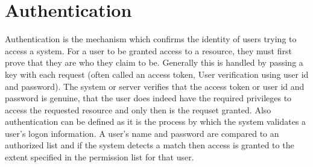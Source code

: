 \section{Authentication}
Authentication is the mechanism which confirms the identity of users trying to access a system. For a user to be granted access to a resource, they must first prove that they are who they claim to be. Generally this is handled by passing a key with each request (often called an access token, User verification using user id and password). The system or server verifies that the access token or user id and password is genuine, that the user does indeed have the required privileges to access the requested resource and only then is the requset granted.
Also authentication can be defined as it is the process by which the system validates a user's logon information. A user's name and password are compared to an authorized list and if the system detects a match then access is granted to the extent specified in the permission list for that user.
